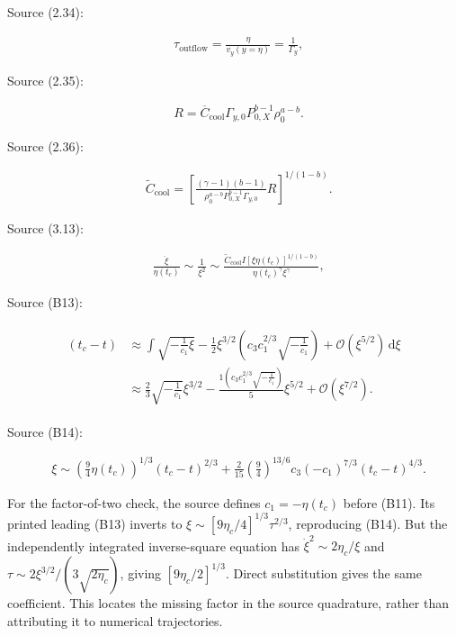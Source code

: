 Source (2.34):

\[
\begin{aligned} & \tau _{\text{outflow}} =\frac {\eta }{v_y(y=\eta )}=\frac {1}{\varGamma _y} , \end{aligned}\tag{S2.34}
\]

Source (2.35):

\[
\begin{aligned} & R=\overline {C}_{\text{cool}} \varGamma _{y,0}P_{0,X}^{b-1}\rho _0^{a-b}. \end{aligned}\tag{S2.35}
\]

Source (2.36):

\[
\begin{aligned} & \widetilde {C}_{\text{cool}}=\left [\frac {(\gamma -1)(b-1)}{\rho _0^{a-b}P_{0,X}^{b-1}\varGamma _{y,0}}R\right ]^{{1}/{(1-b)}}. \end{aligned}\tag{S2.36}
\]

Source (3.13):

\[
\begin{aligned} & \frac {\ddot {\xi }}{\eta (t_c)} \sim \frac {1}{\xi ^2}\sim \frac {\widetilde {C}_{\text{cool}} I[\xi \eta (t_c)]^{1/(1-b)}}{\eta (t_c)^{\gamma }\xi ^\gamma }, \end{aligned}\tag{S3.13}
\]

Source (B13):

\[
\begin{gathered}\textstyle \begin{aligned} \left (t_c-t\right ) &\approx \int \sqrt {-\frac {1}{c_1} \xi }-\frac {1}{2} \xi ^{3/2}\left (c_3 c_1^{2/3} \sqrt {-\frac {1}{c_1}}\right )+\mathcal{O}\left (\xi ^{5/2}\right ) \,\text{d} \xi \\[5pt] & \approx \frac {2}{3} \sqrt {-\frac {1}{c_1}} \xi ^{3/2}-\frac {1\left (c_3 c_1^{2/3} \sqrt {-\frac {1}{c_1}}\right )}{5} \xi ^{5/2}+\mathcal{O}\left (\xi ^{7/2}\right ). \end{aligned}\end{gathered}\tag{SB13}
\]

Source (B14):

\[
\begin{aligned} & \xi \sim \left (\frac {9}{4}\eta (t_c)\right )^{1/3}(t_c-t)^{2/3}+\frac {2}{15}\left (\frac {9}{4}\right )^{13/6}c_3(-c_1)^{7/3}(t_c-t)^{4/3}. \end{aligned}\tag{SB14}
\]

For the factor-of-two check, the source defines \(c_1=-\eta(t_c)\)
before (B11). Its printed leading (B13) inverts to
\(\xi\sim[9\eta_c/4]^{1/3}\tau^{2/3}\), reproducing (B14). But the
independently integrated inverse-square equation has
\(\dot\xi^2\sim2\eta_c/\xi\) and
\(\tau\sim2\xi^{3/2}/(3\sqrt{2\eta_c})\), giving \([9\eta_c/2]^{1/3}\).
Direct substitution gives the same coefficient. This locates the missing
factor in the source quadrature, rather than attributing it to numerical
trajectories.

